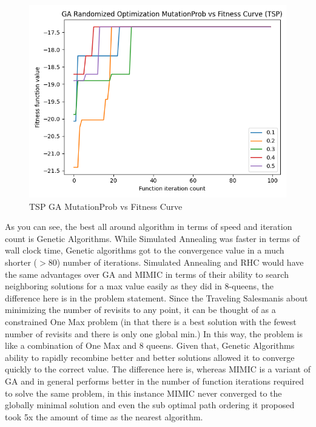 \documentclass[11pt]{article}
\newcommand{\problemthree}{Traveling Salesman}
\begin{document}
    \begin{figure}
        \begin{center}
            \includegraphics[width=1\linewidth]{tspmutprob.png}
            \caption{TSP GA MutationProb vs Fitness Curve}\label{Fig:TSP GA MutationProb vs Fitness Curve}
        \end{center}
    \end{figure}
    As you can see, the best all around algorithm in terms of speed and iteration count is Genetic Algorithms.
    While Simulated Annealing was faster in terms of wall clock time, Genetic algorithms got to the convergence value in
    a much shorter ($> 80$) number of iterations.
    Simulated Annealing and RHC would have the same advantages over GA and MIMIC in terms of their ability to search neighboring
    solutions for a max value easily as they did in 8-queens, the difference here is in the problem statement.
    Since the \problemthree is about minimizing the number of revisits to any point, it can be thought of as a constrained
    One Max problem (in that there is a best solution with the fewest number of revisits and there is only one global min.)
    In this way, the problem is like a combination of One Max and 8 queens.
    Given that, Genetic Algorithms ability to rapidly recombine better and better solutions allowed it to converge quickly
    to the correct value.
    The difference here is, whereas MIMIC is a variant of GA and in general performs better in the number of function iterations
    required to solve the same problem, in this instance MIMIC never converged to the globally minimal solution and even the
    sub optimal path ordering it proposed took 5x the amount of time as the nearest algorithm.
\end{document}
